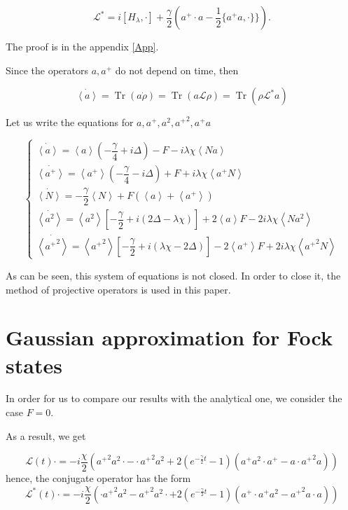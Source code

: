 \documentclass[12pt]{article}
\theoremstyle{definition}
\newcommand\Tr{\operatorname{Tr}}
\newcommand\bra{\left<}
\newcommand\ket{\right>}
\newcommand{\braket}[1]{\bra#1\ket}
\def\DE {\Delta}
\def\ga {\gamma}
\def\la {\lambda}
\begin{document}
	\begin{equation}
		\label{eq:Lst}
		\mathcal{L}^* = i[H_{\la},\cdot]  + \dfrac{\ga}{2}(a^+\cdot a - \dfrac{1}{2}\{a^+a,\cdot\}\}).
	\end{equation}
	
	The proof is in the appendix \ref{App}.
	
	
	
	
	Since the operators $a, a^+$ do not depend on time, then
	
	\begin{equation}
		\label{eq:DinOfAv}
		\dot{\braket{a}} = \Tr(a\dot{\rho}) = \Tr(a\mathcal{L}\rho) = \Tr(\rho\mathcal{L}^*a)
	\end{equation}
	
	
	Let us write the equations for $a, a^+, a^2, {a^+}^2, a^+a$
	
	\begin{equation}
		\label{eq:FinDinOfAv}
		\left\{\begin{array}{llll}
			\dot{\braket{a}} = \braket{a}(-\dfrac{\ga}{4} + i\DE) - F - i\la\chi\braket{Na}\\
			\dot{\braket{a^+}} = \braket{a^+}(-\dfrac{\ga}{4} - i\DE) + F + i\la\chi\braket{a^+N}\\
			\dot{\braket{N}} = -\dfrac{\ga}{2}\braket{N} + F(\braket{a} + \braket{a^+})\\
			\dot{\braket{a^2}} = \braket{a^2}[-\dfrac{\ga}{2} + i(2\DE - \la\chi)] + 2\braket{a}F - 2i\la\chi\braket{Na^2}\\
			\dot{\braket{{a^+}^2}} = \braket{{a^+}^2}[-\dfrac{\ga}{2} + i(\la\chi - 2\DE)] - 2\braket{a^+}F + 2i\la\chi\braket{{a^+}^2N}
		\end{array}
		\right.
	\end{equation}
	
	As can be seen, this system of equations is not closed. In order to close it, the method of projective operators is used in this paper.
	
	\section{Gaussian approximation for Fock states\label{sec:feq0}}
	
	In order for us to compare our results with the analytical one, we consider the case $F = 0$.
	
	As a result, we get
	
	\begin{equation}
		\label{eq:InterRep}
		\mathcal{L}(t)\cdot = -i\frac{\chi}{2}({a^+}^2a^2\cdot - \cdot{a^+}^2a^2 + 2   (e^{-\frac{\ga}{2}t} - 1) (a^+a^2\cdot a^+ - a\cdot {a^+}^2a) )
	\end{equation}
	hence, the conjugate operator has the form
	\begin{equation}
		\label{eq:InterRepCon}
		\mathcal{L}^*(t)\cdot = -i\frac{\chi}{2}(\cdot{a^+}^2a^2 - {a^+}^2a^2\cdot + 2   (e^{-\frac{\ga}{2}t} - 1) ( a^+\cdot a^+a^2 - {a^+}^2a\cdot a) )
	\end{equation}
	
\end{document}

